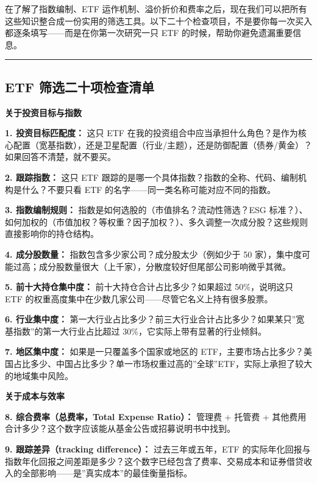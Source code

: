 \documentclass[a4paper,11pt,oneside,fontset=none,UTF8,zihao=-4]{ctexbook}
\begin{document}
在了解了指数编制、ETF
运作机制、溢价折价和费率之后，现在我们可以把所有这些知识整合成一份实用的筛选工具。以下二十个检查项目，不是要你每一次买入都逐条填写------而是在你第一次研究一只
ETF 的时候，帮助你避免遗漏重要信息。

\begin{center}{\color{dh-bronze}\rule{0.2\textwidth}{0.5pt}}\end{center}

\subsection{ETF
筛选二十项检查清单}\label{etf-ux7b5bux9009ux4e8cux5341ux9879ux68c0ux67e5ux6e05ux5355}

\textbf{关于投资目标与指数}

\textbf{1. 投资目标匹配度：} 这只 ETF
在我的投资组合中应当承担什么角色？是作为核心配置（宽基指数），还是卫星配置（行业/主题），还是防御配置（债券/黄金）？如果回答不清楚，就不要买。

\textbf{2. 跟踪指数：} 这只 ETF
跟踪的是哪一个具体指数？指数的全称、代码、编制机构是什么？不要只看 ETF
的名字------同一类名称可能对应不同的指数。

\textbf{3. 指数编制规则：} 指数是如何选股的（市值排名？流动性筛选？ESG
标准？）、如何加权的（市值加权？等权重？因子加权？）、多久调整一次成分股？这些规则直接影响你的持仓结构。

\textbf{4. 成分股数量：} 指数包含多少家公司？成分股太少（例如少于 50
家），集中度可能过高；成分股数量很大（上千家），分散度较好但尾部公司影响微乎其微。

\textbf{5. 前十大持仓集中度：} 前十大持仓合计占比多少？如果超过
50\%，说明这只 ETF
的权重高度集中在少数几家公司------尽管它名义上持有很多股票。

\textbf{6. 行业集中度：}
第一大行业占比多少？前三大行业合计占比多少？如果某只''宽基指数''的第一大行业占比超过
30\%，它实际上带有显著的行业倾斜。

\textbf{7. 地区集中度：} 如果是一只覆盖多个国家或地区的
ETF，主要市场占比多少？美国占比多少、中国占比多少？单一市场权重过高的''全球''ETF，实际上承担了较大的地域集中风险。

\textbf{关于成本与效率}

\textbf{8. 综合费率（总费率，Total Expense Ratio）：} 管理费 + 托管费 +
其他费用合计多少？这个数字应该能从基金公告或招募说明书中找到。

\textbf{9. 跟踪差异（tracking difference）：} 过去三年或五年，ETF
的实际年化回报与指数年化回报之间差距是多少？这个数字已经包含了费率、交易成本和证券借贷收入的全部影响------是''真实成本''的最佳衡量指标。
\end{document}
